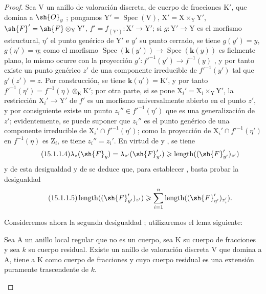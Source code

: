 \begin{proof}
Sea $\mathrm{V}$ un anillo de valoración discreta, de cuerpo de fracciones $\mathrm{K}'$, que domina a $\sh{O}_y$ ; pongamos $\mathrm{Y}'=\operatorname{Spec}(\mathrm{V})$, $\mathrm{X}'=\mathrm{X}\times_\mathrm{Y}\mathrm{Y}'$, $\sh{F}'=\sh{F}\otimes_\mathrm{Y}\mathrm{Y}'$, $f'=f_{(\mathrm{Y}')}:\mathrm{X}'\to\mathrm{Y}'$; si $g:\mathrm{Y}'\to\mathrm{Y}$ es el morfismo estructural, $\eta'$ el punto genérico de $\mathrm{Y}'$ e $y'$ su punto cerrado, se tiene $g(y')=y$, $g(\eta')=\eta$; como el morfismo $\operatorname{Spec}(\boldsymbol{k}(y'))\to\operatorname{Spec}(\boldsymbol{k}(y))$ es fielmente plano, lo mismo ocurre con la proyección $g':f'^{-1}(y')\to f^{-1}(y)$ , y por tanto  existe un punto genérico $z'$ de una componente irreducible de $f'^{-1}(y')$ tal que $g'(z')=z$.
Por construcción, se tiene $\boldsymbol{k}(\eta')=\mathrm{K}'$, y por tanto $f'^{-1}(\eta')=f^{-1}(\eta)\otimes_\mathrm{K}\mathrm{K}'$; por otra parte, si se pone $\mathrm{X}_i'=\mathrm{X}_i\times_\mathrm{Y}\mathrm{Y}'$, la restricción $\mathrm{X}_i'\to\mathrm{Y}'$ de $f'$ es un morfismo universalmente abierto en el punto $z'$, y por consiguiente  existe un punto $z_i''\in f'^{-1}(\eta')$ que es una generalización de $z'$; evidentemente, se puede suponer que $z_i''$ es el punto genérico de una componente irreducible de $\mathrm{X}_i'\cap f'^{-1}(\eta')$; como la proyección de $\mathrm{X}_i'\cap f'^{-1}(\eta')$ en $f^{-1}(\eta)$ es $\mathrm{Z}_i$, se tiene $z_i''=z_i'$.
En virtud de  y , se tiene
\[
\tag{15.1.1.4}
\label{IV.15.1.1.4}
  \lambda_z(\sh{F}_y)=\lambda_{z'}(\sh{F}'_{y'})\geqslant\operatorname{length}((\sh{F}'_{y'})_{z'})
\]
y de esta desigualdad y de  se deduce que, para establecer , basta probar la desigualdad
\[
\tag{15.1.1.5}
\label{IV.15.1.1.5}
  \operatorname{length}((\sh{F}_{y'}')_{z'})\geqslant\sum_{i=1}^{n}\operatorname{length}((\sh{F}_{\eta'}')_{z_i'}).
\]

Consideremos ahora la segunda desigualdad ; utilizaremos el lema siguiente:

\begin{lemma}[15.1.1.6]
\label{IV.15.1.1.6}
Sea $\mathrm{A}$ un anillo local regular que no es un cuerpo, sea $\mathrm{K}$ su cuerpo de fracciones y sea $k$ su cuerpo residual.
Existe un anillo de valoración discreta $\mathrm{V}$ que domina a $\mathrm{A}$, tiene a $\mathrm{K}$ como cuerpo de fracciones y cuyo cuerpo residual es una extensión puramente trascendente de $k$.
\end{lemma}


\end{proof}
